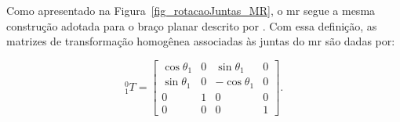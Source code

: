 







Como apresentado na Figura~\ref{fig_rotacaoJuntas_MR}, o \gls{mr} segue a mesma construção adotada para o braço planar descrito por \cite{sciavicco_siciliano2010}. Com essa definição, as matrizes de transformação homogênea associadas às juntas do \gls{mr} são dadas por:

\begin{equation}
{}^{0}_{1}T
=
\begin{bmatrix}
\cos\theta_{1} & 0 & \sin\theta_{1} & 0 \\
\sin\theta_{1} & 0 & -\cos\theta_{1} & 0 \\
0 & 1 & 0 & 0 \\
0 & 0 & 0 & 1
\end{bmatrix}.
\label{eq_T01}
\end{equation}

